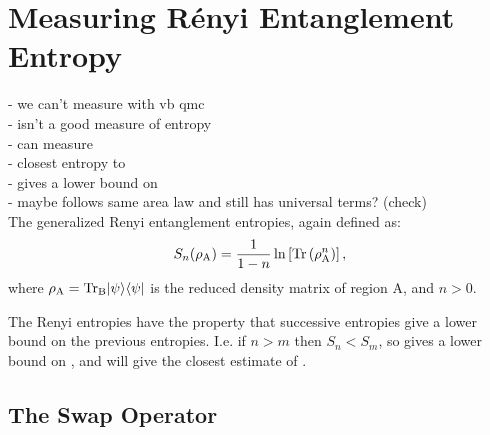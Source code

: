 \chapter{Measuring R\'{e}nyi Entanglement Entropy}

\noindent
- we can't measure \vn with vb qmc\\
- \vb isn't a good measure of entropy\\
- can measure \re\\
 - closest entropy to \vn\\
 - gives a lower bound on \vn\\
 - maybe follows same area law and still has universal terms? (check)\\
 
The generalized Renyi entanglement entropies, again defined as:
\begin{equation}
 	S_n(\rho_{\rm A}) = \frac{1}{1-n}\ln\left[{\rm Tr}\left( \rho_{\rm A}^n \right) \right],
\end{equation}
where $\rho_{\rm{A}}=\rm{Tr}_B\lvert {\psi} \rangle\langle {\psi} \rvert$ is the reduced density matrix of region A, and $n>0$.




The Renyi entropies have the property that successive entropies give a lower bound on the previous entropies.  I.e. if $n>m$ then $S_n<S_m$, so \re gives a lower bound on \vn, and \re will give the closest estimate of \vn.
\section{The Swap Operator}

